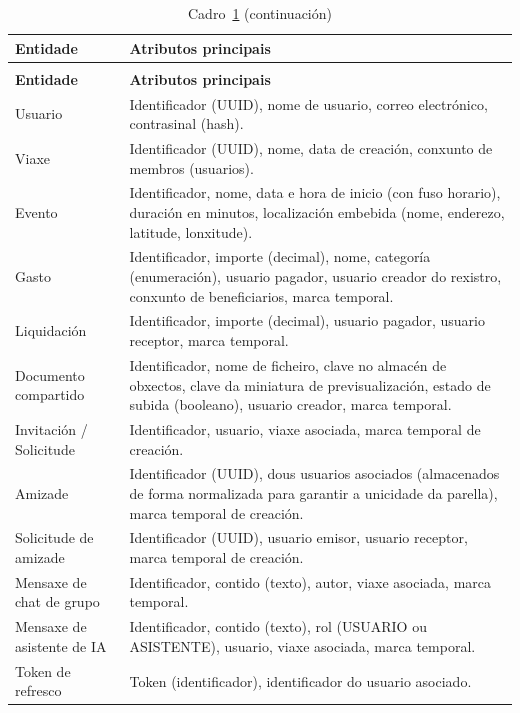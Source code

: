 \begin{longtable}{@{}p{4cm}p{10.3cm}@{}}
  \caption{Entidades persistidas no servidor.}
  \label{tab:entidades} \\
  \toprule
  \textbf{Entidade} & \textbf{Atributos principais} \\
  \midrule
  \endfirsthead
  \caption*{Cadro~\ref{tab:entidades} (continuación)} \\
  \toprule
  \textbf{Entidade} & \textbf{Atributos principais} \\
  \midrule
  \endhead
  Usuario                    & Identificador (UUID), nome de usuario, correo electrónico, contrasinal (hash). \\[4pt]
  Viaxe                      & Identificador (UUID), nome, data de creación, conxunto de membros (usuarios). \\[4pt]
  Evento                     & Identificador, nome, data e hora de inicio (con fuso horario), duración en minutos, localización embebida (nome, enderezo, latitude, lonxitude). \\[4pt]
  Gasto                      & Identificador, importe (decimal), nome, categoría (enumeración), usuario pagador, usuario creador do rexistro, conxunto de beneficiarios, marca temporal. \\[4pt]
  Liquidación                & Identificador, importe (decimal), usuario pagador, usuario receptor, marca temporal. \\[4pt]
  Documento compartido       & Identificador, nome de ficheiro, clave no almacén de obxectos, clave da miniatura de previsualización, estado de subida (booleano), usuario creador, marca temporal. \\[4pt]
  Invitación / Solicitude    & Identificador, usuario, viaxe asociada, marca temporal de creación. \\[4pt]
  Amizade                    & Identificador (UUID), dous usuarios asociados (almacenados de forma normalizada para garantir a unicidade da parella), marca temporal de creación. \\[4pt]
  Solicitude de amizade      & Identificador (UUID), usuario emisor, usuario receptor, marca temporal de creación. \\[4pt]
  Mensaxe de chat de grupo   & Identificador, contido (texto), autor, viaxe asociada, marca temporal. \\[4pt]
  Mensaxe de asistente de IA & Identificador, contido (texto), rol (USUARIO ou ASISTENTE), usuario, viaxe asociada, marca temporal. \\[4pt]
  Token de refresco          & Token (identificador), identificador do usuario asociado. \\
  \bottomrule
\end{longtable}

